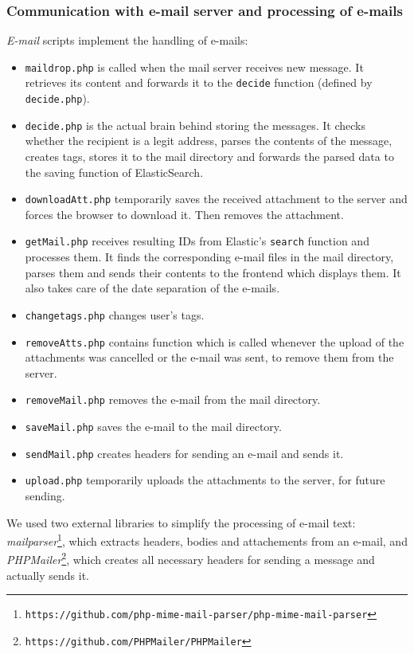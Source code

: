 \subsubsection{Communication with e-mail server and processing of e-mails}
\emph{E-mail} scripts implement the handling of e-mails:
\begin{itemize}
\item \texttt{maildrop.php} is called when the mail server receives new message. It retrieves its content and forwards it to the \texttt{decide} function (defined by \texttt{decide.php}).
\item \texttt{decide.php} is the actual brain behind storing the messages. It checks whether the recipient is a legit address, parses the contents of the message, creates tags, stores it to the mail directory and forwards the parsed data to the saving function of ElasticSearch.
\item \texttt{downloadAtt.php} temporarily saves the received attachment to the server and forces the browser to download it. Then removes the attachment.
\item \texttt{getMail.php} receives resulting IDs from Elastic's \texttt{search} function and processes them. It finds the corresponding e-mail files in the mail directory, parses them and sends their contents to the frontend which displays them. It also takes care of the date separation of the e-mails.
\item \texttt{changetags.php} changes user's tags.
\item \texttt{removeAtts.php} contains function which is called whenever the upload of the attachments was cancelled or the e-mail was sent, to remove them from the server.
\item \texttt{removeMail.php} removes the e-mail from the mail directory.
\item \texttt{saveMail.php} saves the e-mail to the mail directory.
\item \texttt{sendMail.php} creates headers for sending an e-mail and sends it.
\item \texttt{upload.php} temporarily uploads the attachments to the server, for future sending.
\end{itemize}
We used two external libraries to simplify the processing of e-mail text: \emph{mailparser}\footnote{\texttt{https://github.com/php-mime-mail-parser/php-mime-mail-parser}}, which extracts headers, bodies and attachements from an e-mail, and \emph{PHPMailer}\footnote{\texttt{https://github.com/PHPMailer/PHPMailer}}, which creates all necessary headers for sending a message and actually sends it.

